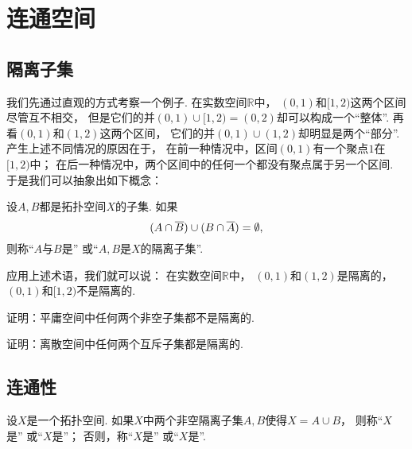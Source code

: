 \section{连通空间}
\subsection{隔离子集}
我们先通过直观的方式考察一个例子.
在实数空间\(\mathbb{R}\)中，
\((0,1)\)和\([1,2)\)这两个区间尽管互不相交，
但是它们的并\((0,1)\cup[1,2)=(0,2)\)却可以构成一个“整体”.
再看\((0,1)\)和\((1,2)\)这两个区间，
它们的并\((0,1)\cup(1,2)\)却明显是两个“部分”.
产生上述不同情况的原因在于，
在前一种情况中，区间\((0,1)\)有一个聚点\(1\)在\([1,2)\)中；
在后一种情况中，两个区间中的任何一个都没有聚点属于另一个区间.
于是我们可以抽象出如下概念：
\begin{definition}
设\(A,B\)都是拓扑空间\(X\)的子集.
如果\begin{equation*}
	(A \cap \overline{B}) \cup (B \cap \overline{A}) = \emptyset,
\end{equation*}
则称“\(A\)与\(B\)是”
或“\(A,B\)是\(X\)的隔离子集”.
\end{definition}

应用上述术语，我们就可以说：
在实数空间\(\mathbb{R}\)中，
\((0,1)\)和\((1,2)\)是隔离的，
\((0,1)\)和\([1,2)\)不是隔离的.

\begin{example}
证明：平庸空间中任何两个非空子集都不是隔离的.
\end{example}

\begin{example}
证明：离散空间中任何两个互斥子集都是隔离的.
\end{example}

\subsection{连通性}
\begin{definition}
设\(X\)是一个拓扑空间.
如果\(X\)中两个非空隔离子集\(A,B\)使得\(X = A \cup B\)，
则称“\(X\)是”
或“\(X\)是”；
否则，称“\(X\)是”
或“\(X\)是”.
\end{definition}

